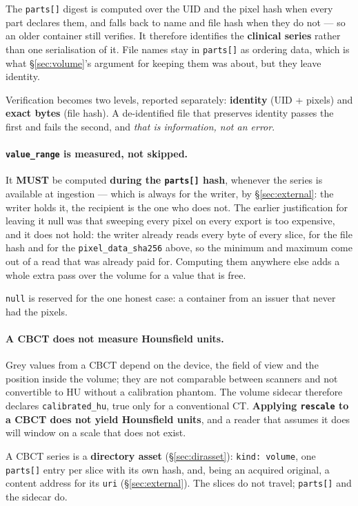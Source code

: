 \documentclass[11pt,a4paper]{article}
\newcommand{\MUST}{\textcolor{uosred}{\textbf{MUST}}}
\newcommand{\code}[1]{\texttt{\small #1}}
\begin{document}
The \code{parts[]} digest is computed over the UID and the pixel hash when every part
declares them, and falls back to name and file hash when they do not --- so an older
container still verifies. It therefore identifies the \textbf{clinical series} rather than
one serialisation of it. File names stay in \code{parts[]} as ordering data, which is what
\S\ref{sec:volume}'s argument for keeping them was about, but they leave identity.

Verification becomes two levels, reported separately: \textbf{identity} (UID + pixels) and
\textbf{exact bytes} (file hash). A de-identified file that preserves identity passes the
first and fails the second, and \emph{that is information, not an error}.

\paragraph{\code{value\_range} is measured, not skipped.}
It \MUST{} be computed \textbf{during the \code{parts[]} hash}, whenever the series is
available at ingestion --- which is always for the writer, by \S\ref{sec:external}: the
writer holds it, the recipient is the one who does not. The earlier justification for
leaving it null was that sweeping every pixel on every export is too expensive, and it does
not hold: the writer already reads every byte of every slice, for the file hash and for the
\code{pixel\_data\_sha256} above, so the minimum and maximum come out of a read that was
already paid for. Computing them anywhere else adds a whole extra pass over the volume for
a value that is free.

\code{null} is reserved for the one honest case: a container from an issuer that never had
the pixels.

\paragraph{A CBCT does not measure Hounsfield units.}
Grey values from a CBCT depend on the device, the field of view and the position inside the
volume; they are not comparable between scanners and not convertible to HU without a
calibration phantom. The volume sidecar therefore declares \code{calibrated\_hu}, true only
for a conventional CT. \textbf{Applying \code{rescale} to a CBCT does not yield Hounsfield
units}, and a reader that assumes it does will window on a scale that does not exist.

A CBCT series is a \textbf{directory asset} (\S\ref{sec:dirasset}): \code{kind: volume},
one \code{parts[]} entry per slice with its own hash, and, being an acquired original, a content address for its \code{uri} (\S\ref{sec:external}). The slices do not travel;
\code{parts[]} and the sidecar do.
\end{document}
